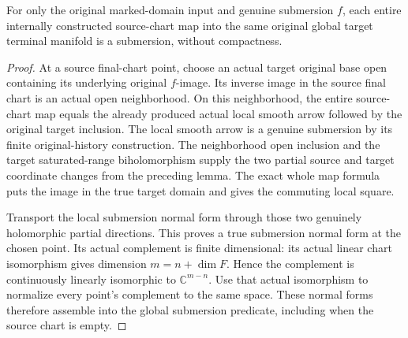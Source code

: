 \begin{theorem}
\label{hir:original-entire-source-terminal-chart-smooth-map-submersion}
\leanok
{}
For only the original marked-domain input and genuine submersion $f$, each
entire internally constructed source-chart map into the same original
global target terminal manifold is a submersion, without compactness.
\end{theorem}
\begin{proof}
At a source final-chart point, choose an actual target original base open
containing its underlying original $f$-image. Its inverse image in the
source final chart is an actual open neighborhood. On this neighborhood,
the entire source-chart map equals the already produced actual local
smooth arrow followed by the original target inclusion. The local smooth
arrow is a genuine submersion by its finite original-history construction.
The neighborhood open inclusion and the target saturated-range
biholomorphism supply the two partial source and target coordinate changes
from the preceding lemma. The exact whole map formula puts the image in
the true target domain and gives the commuting local square.

Transport the local submersion normal form through those two genuinely
holomorphic partial directions. This proves a true submersion normal form
at the chosen point. Its actual complement is finite dimensional: its
actual linear chart isomorphism gives dimension $m=n+\dim F$. Hence the
complement is continuously linearly isomorphic to $\mathbb C^{m-n}$.
Use that actual isomorphism to normalize every point's complement to the
same space. These normal forms therefore assemble into the global
submersion predicate, including when the source chart is empty.
\end{proof}


